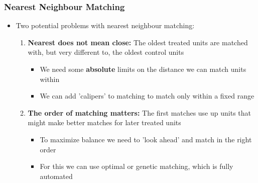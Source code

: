\documentclass[xcolor=x11names,compress]{beamer}\usepackage[]{graphicx}\usepackage[]{color}
\renewcommand{\(}{\begin{columns}}
\renewcommand{\)}{\end{columns}}
\newcommand{\<}[1]{\begin{column}{#1}}
\renewcommand{\>}{\end{column}}
\begin{document}
\begin{frame}
\frametitle{Nearest Neighbour Matching}
\begin{itemize}
\item Two potential problems with nearest neighbour matching:
\pause
\begin{enumerate}
\item \textbf{Nearest does not mean close:} The oldest treated units are matched with, but very different to, the oldest control units
\pause
\begin{itemize}
\item We need some \textbf{absolute} limits on the distance we can match units within
\pause
\item We can add 'calipers' to matching to match only within a fixed range
\pause
\end{itemize}
\item \textbf{The order of matching matters:} The first matches use up units that might make better matches for later treated units
\pause
\begin{itemize}
\item To maximize balance we need to 'look ahead' and match in the right order
\pause
\item For this we can use optimal or genetic matching, which is fully automated
\end{itemize}
\end{enumerate}
\end{itemize}
\end{frame}
\end{document}
